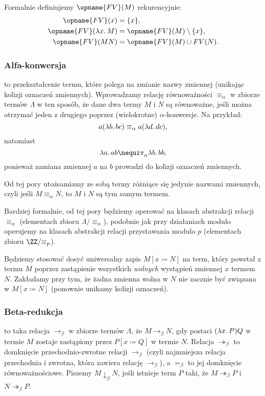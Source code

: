 \documentclass[polish,pretty]{angav}
\newcommand{\toto}{\twoheadrightarrow}
\newcommand{\FV}{\opname{FV}}
\begin{document}
\begin{remark}
    Formalnie definiujemy $\FV(M)$ rekurencyjnie:
    \begin{align*}
        \FV(x) &= \{x\}, \\
        \FV(\lambda x\ldotp M) &= \FV(M) \setminus \{x\}, \\
        \FV(MN) &= \FV(M) \cup FV(N).
    \end{align*}
\end{remark}

\subsubsection*{Alfa-konwersja}

 to przekształcenie termu, które polega na zmianie nazwy zmiennej (unikając kolizji oznaczeń zmiennych). Wprowadzamy relację równoważności $\equiv_\alpha$ w zbiorze termów $\Lambda$ w ten sposób, że dane dwa termy $M$ i $N$ są równoważne, jeśli można otrzymać jeden z drugiego poprzez (wielokrotne) $\alpha$-konwersje. Na przykład:
\[ a (\lambda b\ldotp bc) \equiv_\alpha a (\lambda d\ldotp dc), \]
natomiast
\[ \lambda a\ldotp ab \nequiv_\alpha \lambda b\ldotp bb, \]
ponieważ zamiana zmiennej $a$ na $b$ prowadzi do kolizji oznaczeń zmiennych.

Od tej pory utożsamiamy ze sobą termy różniące się jedynie nazwami zmiennych, czyli jeśli $M \equiv_\alpha N$, to $M$ i $N$ są tym samym termem.

\begin{remark}
    Bardziej formalnie, od tej pory będziemy operować na klasach abstrakcji relacji $\equiv_\alpha$ (elementach zbioru $\Lambda/{\equiv_\alpha}$), podobnie jak przy działaniach modulo operujemy na klasach abstrakcji relacji przystawania modulo $p$ (elementach zbioru $\ZZ/{\equiv_p}$).
\end{remark}

Będziemy stosować dosyć uniwersalny zapis $M[x \coloneqq N]$ na term, który powstał z termu $M$ poprzez zastąpienie wszystkich \emph{wolnych} wystąpień zmiennej $x$ termem $N$.
Zakładamy przy tym, że żadna zmienna wolna w $N$ nie zacznie być związana w $M[x \coloneqq N]$ (ponownie unikamy kolizji oznaczeń).

\subsubsection*{Beta-redukcja}

 to taka relacja $\to_\beta$ w zbiorze termów $\Lambda$, że $M \to_\beta N$, gdy  postaci $(\lambda x\ldotp P)Q$ w termie $M$ zostaje zastąpiony przez $P[x \coloneqq Q]$ w termie $N$.
Relacja $\toto_\beta$ to domknięcie przechodnio-zwrotne relacji $\to_\beta$ (czyli najmniejsza relacja przechodnia i zwrotna, która zawiera relację $\to_\beta$), a $=_\beta$ to jej domknięcie równoważnościowe.
Piszemy $M \downarrow_\beta N$, jeśli istnieje term $P$ taki, że $M \toto_\beta P$ i $N \toto_\beta P$.
\end{document}
